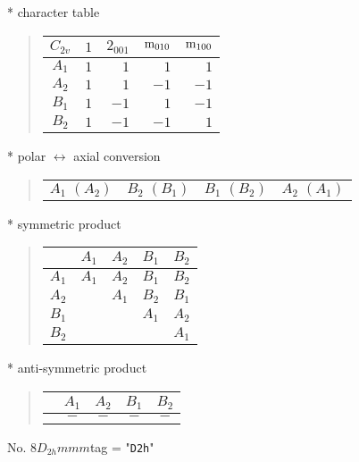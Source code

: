 \documentclass[fleqn,10pt,landscape]{jsarticle}
\begin{document}
* character table
\begin{quote}
\begin{tabular}{crrrr} \hline \hline
$ C_{2v} $ & $ 1 $ & $ 2{}_{001} $ & $ {\rm m}_{010} $ & $ {\rm m}_{100} $ \\ \hline
$ A_{1} $ & $ 1 $ & $ 1 $ & $ 1 $ & $ 1 $ \\
$ A_{2} $ & $ 1 $ & $ 1 $ & $ -1 $ & $ -1 $ \\
$ B_{1} $ & $ 1 $ & $ -1 $ & $ 1 $ & $ -1 $ \\
$ B_{2} $ & $ 1 $ & $ -1 $ & $ -1 $ & $ 1 $ \\
 \hline \hline
\end{tabular}
\end{quote}
* polar $\leftrightarrow$ axial conversion
\begin{quote}
\begin{tabular}{cccc}
$ A_{1}\,\,(A_{2}) $ & $ B_{2}\,\,(B_{1}) $ & $ B_{1}\,\,(B_{2}) $ & $ A_{2}\,\,(A_{1}) $
\end{tabular}
\end{quote}
* symmetric product
\begin{quote}
\begin{tabular}{c|cccc} \hline \hline
 & $ A_{1} $ & $ A_{2} $ & $ B_{1} $ & $ B_{2} $ \\ \hline
$ A_{1} $ & $ A_{1} $ & $ A_{2} $ & $ B_{1} $ & $ B_{2} $ \\
$ A_{2} $ & $  $ & $ A_{1} $ & $ B_{2} $ & $ B_{1} $ \\
$ B_{1} $ & $  $ & $  $ & $ A_{1} $ & $ A_{2} $ \\
$ B_{2} $ & $  $ & $  $ & $  $ & $ A_{1} $ \\
 \hline \hline
\end{tabular}
\end{quote}
* anti-symmetric product
\begin{quote}
\begin{tabular}{ccccc} \hline \hline
 & $ A_{1} $ & $ A_{2} $ & $ B_{1} $ & $ B_{2} $ \\ \hline
$  $ & $ - $ & $ - $ & $ - $ & $ - $ \\
 \hline \hline
\end{tabular}
\end{quote}
\newpage
No. 8\quad$D_{2h}$\quad$mmm$\quad[ orthorhombic ]
tag = "{\tt D2h}"
\end{document}
